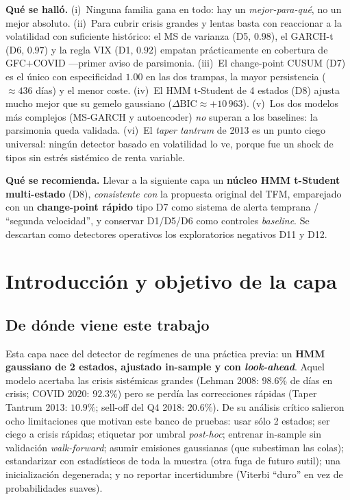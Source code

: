 \documentclass[11pt,a4paper]{article}
\begin{document}
\textbf{Qu\'e se hall\'o.} (i)~Ninguna familia gana en todo: hay un \emph{mejor-para-qu\'e},
no un mejor absoluto. (ii)~Para cubrir crisis grandes y lentas basta con reaccionar a la
volatilidad con suficiente hist\'orico: el MS de varianza (D5, $0.98$), el GARCH-t (D6,
$0.97$) y la regla VIX (D1, $0.92$) empatan pr\'acticamente en cobertura de
GFC$+$COVID ---primer aviso de parsimonia. (iii)~El change-point CUSUM (D7) es el \'unico
con especificidad $1.00$ en las dos trampas, la mayor persistencia ($\approx436$ d\'ias) y
el menor coste. (iv)~El HMM t-Student de 4 estados (D8) ajusta mucho mejor que su gemelo
gaussiano ($\Delta\mathrm{BIC}\approx{+}10\,963$). (v)~Los dos modelos m\'as complejos
(MS-GARCH y autoencoder) \emph{no} superan a los baselines: la parsimonia queda validada.
(vi)~El \emph{taper tantrum} de 2013 es un punto ciego universal: ning\'un detector basado
en volatilidad lo ve, porque fue un shock de tipos sin estr\'es sist\'emico de renta
variable.

\textbf{Qu\'e se recomienda.} Llevar a la siguiente capa un \textbf{n\'ucleo HMM t-Student
multi-estado} (D8), \emph{consistente con} la propuesta original del TFM, emparejado con un
\textbf{change-point r\'apido} tipo D7 como sistema de alerta temprana / ``segunda
velocidad'', y conservar D1/D5/D6 como controles \emph{baseline}. Se descartan como
detectores operativos los exploratorios negativos D11 y D12.

\section{Introducci\'on y objetivo de la capa}

\subsection{De d\'onde viene este trabajo}
Esta capa nace del detector de reg\'imenes de una pr\'actica previa: un \textbf{HMM
gaussiano de 2 estados, ajustado in-sample y con \emph{look-ahead}}. Aquel modelo acertaba
las crisis sist\'emicas grandes (Lehman 2008: $98.6\%$ de d\'ias en crisis; COVID 2020:
$92.3\%$) pero se perd\'ia las correcciones r\'apidas (Taper Tantrum 2013: $10.9\%$;
sell-off del Q4 2018: $20.6\%$). De su an\'alisis cr\'itico salieron ocho limitaciones que
motivan este banco de pruebas: usar s\'olo 2 estados; ser ciego a crisis r\'apidas;
etiquetar por umbral \emph{post-hoc}; entrenar in-sample sin validaci\'on
\emph{walk-forward}; asumir emisiones gaussianas (que subestiman las colas); estandarizar
con estad\'isticos de toda la muestra (otra fuga de futuro sutil); una inicializaci\'on
degenerada; y no reportar incertidumbre (Viterbi ``duro'' en vez de probabilidades
suaves).
\end{document}
